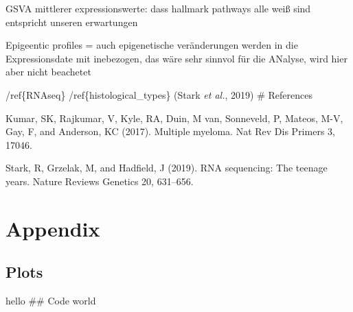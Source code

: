 \documentclass[
  parskip,
  oneside]{scrreprt}
\newlength{\cslhangindent}
\newlength{\cslentryspacingunit} %
\newenvironment{CSLReferences}[2] %
 {%
  \setlength{\parindent}{0pt}
  \ifodd #1
  \let\oldpar\par
  \def\par{\hangindent=\cslhangindent\oldpar}
  \fi
  \setlength{\parskip}{#2\cslentryspacingunit}
 }%
 {}
\begin{document}
GSVA mittlerer expressionswerte: dass hallmark pathways alle weiß sind
entspricht unseren erwartungen

Epigeentic profiles = auch epigenetische veränderungen werden in die
Expressionsdate mit inebezogen, das wäre sehr sinnvol für die ANalyse,
wird hier aber nicht beachetet

/ref\{RNAseq\} /ref\{histological\_types\} (Stark \emph{et al.}, 2019)
\# References

\hypertarget{refs}{}
\begin{CSLReferences}{0}{0}
\leavevmode{}%
Kumar, SK, Rajkumar, V, Kyle, RA, Duin, M van, Sonneveld, P, Mateos,
M-V, Gay, F, and Anderson, KC (2017). Multiple myeloma. Nat Rev Dis
Primers 3, 17046.

\leavevmode{}%
Stark, R, Grzelak, M, and Hadfield, J (2019). RNA sequencing: The
teenage years. Nature Reviews Genetics 20, 631--656.

\end{CSLReferences}

\hypertarget{appendix}{%
\chapter{Appendix}\label{appendix}}

\hypertarget{plots}{%
\section{Plots}\label{plots}}

hello \#\# Code world
\end{document}
